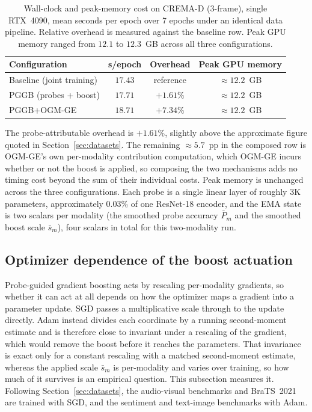 \documentclass{article}
\begin{document}
\begin{table}[H]
\centering
\caption{Wall-clock and peak-memory cost on CREMA-D (3-frame), single RTX~4090, mean seconds per epoch over 7 epochs under an identical data pipeline. Relative overhead is measured against the baseline row. Peak GPU memory ranged from $12.1$ to $12.3$~GB across all three configurations.}
\label{tab:overhead}
\begin{tabular}{lccc}
\toprule
\textbf{Configuration} & \textbf{s/epoch} & \textbf{Overhead} & \textbf{Peak GPU memory} \\
\midrule
Baseline (joint training) & $17.43$ & reference & $\approx 12.2$~GB \\
PGGB (probes + boost)     & $17.71$ & $+1.61\%$ & $\approx 12.2$~GB \\
PGGB+OGM-GE               & $18.71$ & $+7.34\%$ & $\approx 12.2$~GB \\
\bottomrule
\end{tabular}
\end{table}

The probe-attributable overhead is $+1.61\%$, slightly above the approximate figure quoted in Section~\ref{sec:datasets}. The remaining $\approx 5.7$~pp in the composed row is OGM-GE's own per-modality contribution computation, which OGM-GE incurs whether or not the boost is applied, so composing the two mechanisms adds no timing cost beyond the sum of their individual costs. Peak memory is unchanged across the three configurations. Each probe is a single linear layer of roughly 3K parameters, approximately $0.03\%$ of one ResNet-18 encoder, and the EMA state is two scalars per modality (the smoothed probe accuracy $\bar{P}_m$ and the smoothed boost scale $\bar{s}_m$), four scalars in total for this two-modality run.

\subsection{Optimizer dependence of the boost actuation}
\label{app:optimizer}

Probe-guided gradient boosting acts by rescaling per-modality gradients, so whether it can act at all depends on how the optimizer maps a gradient into a parameter update. SGD passes a multiplicative scale through to the update directly. Adam instead divides each coordinate by a running second-moment estimate and is therefore close to invariant under a rescaling of the gradient, which would remove the boost before it reaches the parameters. That invariance is exact only for a constant rescaling with a matched second-moment estimate, whereas the applied scale $\bar{s}_m$ is per-modality and varies over training, so how much of it survives is an empirical question. This subsection measures it. Following Section~\ref{sec:datasets}, the audio-visual benchmarks and BraTS~2021 are trained with SGD, and the sentiment and text-image benchmarks with Adam.
\end{document}
